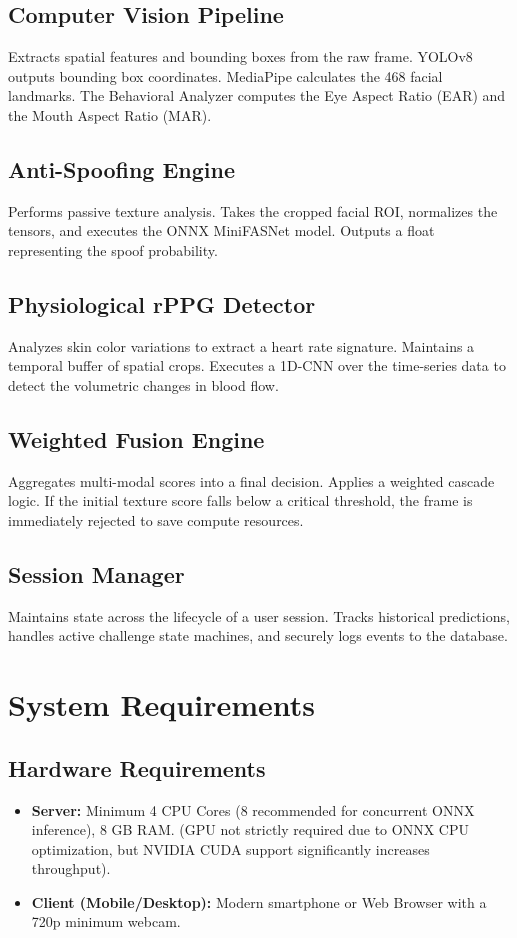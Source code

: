 \documentclass[12pt, a4paper]{report}
\begin{document}
\section{Computer Vision Pipeline}
Extracts spatial features and bounding boxes from the raw frame. YOLOv8 outputs bounding box coordinates. MediaPipe calculates the 468 facial landmarks. The Behavioral Analyzer computes the Eye Aspect Ratio (EAR) and the Mouth Aspect Ratio (MAR).

\section{Anti-Spoofing Engine}
Performs passive texture analysis. Takes the cropped facial ROI, normalizes the tensors, and executes the ONNX MiniFASNet model. Outputs a float representing the spoof probability.

\section{Physiological rPPG Detector}
Analyzes skin color variations to extract a heart rate signature. Maintains a temporal buffer of spatial crops. Executes a 1D-CNN over the time-series data to detect the volumetric changes in blood flow.

\section{Weighted Fusion Engine}
Aggregates multi-modal scores into a final decision. Applies a weighted cascade logic. If the initial texture score falls below a critical threshold, the frame is immediately rejected to save compute resources.

\section{Session Manager}
Maintains state across the lifecycle of a user session. Tracks historical predictions, handles active challenge state machines, and securely logs events to the database.

\fi
\chapter{System Requirements}

\section{Hardware Requirements}
\begin{itemize}
    \item \textbf{Server:} Minimum 4 CPU Cores (8 recommended for concurrent ONNX inference), 8 GB RAM. (GPU not strictly required due to ONNX CPU optimization, but NVIDIA CUDA support significantly increases throughput).
    \item \textbf{Client (Mobile/Desktop):} Modern smartphone or Web Browser with a 720p minimum webcam.
\end{itemize}
\end{document}
